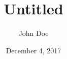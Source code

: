 \documentclass[letterpaper,12pt]{article}
\author{John Doe}
\title{Untitled}
\date{December 4, 2017} %
\begin{document}
    \blindtext        %
\end{document}
